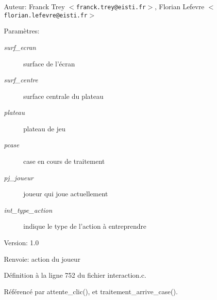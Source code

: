 \begin{Desc}
\item[Auteur:]Franck Trey $<${\tt franck.trey@eisti.fr}$>$, Florian Lefevre $<${\tt florian.lefevre@eisti.fr}$>$\end{Desc}
\begin{Desc}
\item[Param\`{e}tres:]
\begin{description}
\item[{\em surf\_\-ecran}]surface de l'\'{e}cran \item[{\em surf\_\-centre}]surface centrale du plateau \item[{\em plateau}]plateau de jeu \item[{\em pcase}]case en cours de traitement \item[{\em pj\_\-joueur}]joueur qui joue actuellement \item[{\em int\_\-type\_\-action}]indique le type de l'action \`{a} entreprendre\end{description}
\end{Desc}
\begin{Desc}
\item[Version:]1.0 \end{Desc}
\begin{Desc}
\item[Renvoie:]action du joueur \end{Desc}


D\'{e}finition \`{a} la ligne 752 du fichier interaction.c.

R\'{e}f\'{e}renc\'{e} par attente\_\-clic(), et traitement\_\-arrive\_\-case().

